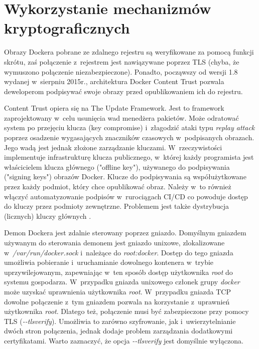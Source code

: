 \section{Wykorzystanie mechanizmów kryptograficznych}

Obrazy Dockera pobrane ze zdalnego rejestru są weryfikowane za pomocą funkcji skrótu, zaś połączenie z~rejestrem jest nawiązywane poprzez TLS (chyba, że wymuszono połączenie niezabezpieczone). Ponadto, począwszy od wersji 1.8 wydanej w~sierpniu 2015r., architektura Docker Content Trust pozwala deweloperom podpisywać swoje obrazy przed opublikowaniem ich do rejestru. 

Content Trust opiera się na The Update Framework. Jest to framework zaprojektowany w~celu usunięcia wad menedżera pakietów. Może odratować system po przejęciu klucza (key compromise) i~złagodzić ataki typu \textit{replay attack} poprzez osadzenie wygasających znaczników czasowych w~podpisanych obrazach. Jego wadą jest jednak złożone zarządzanie kluczami. W~rzeczywistości implementuje infrastrukturę klucza publicznego, w~której każdy programista jest właścicielem klucza głównego ("offline key"), używanego do podpisywania ("signing keys") obrazów Docker. Klucze do podpisywania są współużytkowane przez każdy podmiot, który chce opublikować obraz. Należy w~to również włączyć automatyzowanie podpisów w~rurociągach CI/CD co powoduje dostęp do kluczy przez podmioty zewnętrzne. Problemem jest także dystrybucja (licznych) kluczy głównych \cite{SamuelSurvivableKeyCompromiseInSoftwareUpdateSystems}\cite{CapposAttacksOnPackageManagers}.

Demon Dockera jest zdalnie sterowany poprzez gniazdo. Domyślnym gniazdem używanym do sterowania demonem jest gniazdo unixowe, zlokalizowane w~\textit{/var/run/docker.sock} i~należące do \textit{root:docker}. Dostęp do tego gniazda umożliwia pobieranie i~uruchamianie dowolnego kontenera w~trybie uprzywilejowanym, zapewniając w~ten sposób dostęp użytkownika \textit{root} do systemu gospodarza. W~przypadku gniazda unixowego członek grupy \textit{docker} może uzyskać uprawnienia użytkownika \textit{root}. W~przypadku gniazda TCP dowolne połączenie z~tym gniazdem pozwala na korzystanie z~uprawnień użytkownika \textit{root}. Dlatego też, połączenie musi być zabezpieczone przy pomocy TLS (\textit{-{}-tlsverify}). Umożliwia to zarówno szyfrowanie, jak i~uwierzytelnianie dwóch stron połączenia, jednak dodaje problem zarządzania dodatkowymi certyfikatami. Warto zaznaczyć, że opcja \textit{-{}-tlsverify} jest domyślnie wyłączona.
